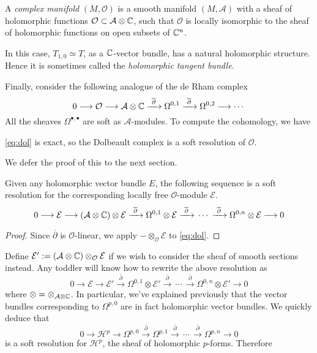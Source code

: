 \documentclass{article}
\newcommand{\dol}{\overline{\partial}}
\begin{document}
\begin{definition}
    A \emph{complex manifold} $(M,\mathcal{O})$ is a smooth manifold $(M,\mathcal{A})$ with a sheaf of holomorphic functions $\mathcal{O}\subset\mathcal{A}\otimes\mathbb{C}$, such that $\mathcal{O}$ is locally isomorphic to the sheaf of holomorphic functions on open subsets of $\mathbb{C}^n$.
\end{definition}

In this case, $T_{1,0}\simeq T$, as a $\mathbb{C}$-vector bundle, has a natural holomorphic structure. Hence it is sometimes called the \emph{holomorphic tangent bundle}.

Finally, consider the following analogue of the de Rham complex
\begin{equation}\label{eq:dol}
    0 \longrightarrow \mathcal{O} \longrightarrow \mathcal{A}\otimes\C \xrightarrow{\ \dol\ } \Omega^{0,1} \xrightarrow{\ \dol\ } \Omega^{0,2} \longrightarrow \cdots
\end{equation}
All the sheaves $\Omega^{\bullet,\bullet}$ are soft as $\mathcal{A}$-modules. To compute the cohomology, we have 

\begin{theorem}\label{thm.poin}
    \eqref{eq:dol} is exact, so the Dolbeault complex is a soft resolution of $\mathcal{O}$.
\end{theorem}

We defer the proof of this to the next section. 

\begin{corollary}
    Given any holomorphic vector bundle $E$, the following sequence is a soft resolution for the corresponding locally free $\mathcal{O}$-module $\mathcal{E}$.
    \[
        0 \longrightarrow \mathcal{E} \longrightarrow (\mathcal{A}\otimes\C)\otimes\mathcal{E} \xrightarrow{\ \dol\ } \Omega^{0,1}\otimes\mathcal{E} \xrightarrow{\ \dol\ } \, \cdots\, \xrightarrow{\ \dol\ } \Omega^{0,n}\otimes\mathcal{E} \longrightarrow 0
    \]
\end{corollary}

\begin{proof}
    Since $\dol$ is $\mathcal{O}$-linear, we apply $-\otimes_{\mathcal{O}}\mathcal{E}$ to \eqref{eq:dol}.
\end{proof}

Define $\mathcal{E}':=(\mathcal{A}\otimes\mathbb{C})\otimes_{\mathcal{O}}\mathcal{E}$ if we wish to consider the sheaf of smooth sections instead. Any toddler will know how to rewrite the above resolution as
\[
    0 \longrightarrow \mathcal{E} \longrightarrow \mathcal{E}' \xrightarrow{\ \dol\ } \Omega^{0,1}\otimes\mathcal{E}' \xrightarrow{\ \dol\ } \, \cdots\, \xrightarrow{\ \dol\ } \Omega^{0,n}\otimes\mathcal{E}' \longrightarrow 0
\]
where $\otimes=\otimes_{\mathcal{A}\otimes\mathbb{C}}$. In particular, we've explained previously that the vector bundles corresponding to $\Omega^{p,0}$ are in fact holomorphic vector bundles. We quickly deduce that
\[
    0 \longrightarrow \mathcal{H}^p \longrightarrow \Omega^{p,0} \xrightarrow{\ \dol\ } \Omega^{p,1} \xrightarrow{\ \dol\ } \, \cdots\, \xrightarrow{\ \dol\ } \Omega^{p,n} \longrightarrow 0
\]
is a soft resolution for $\mathcal{H}^p$, the sheaf of holomorphic $p$-forms. Therefore
\end{document}
